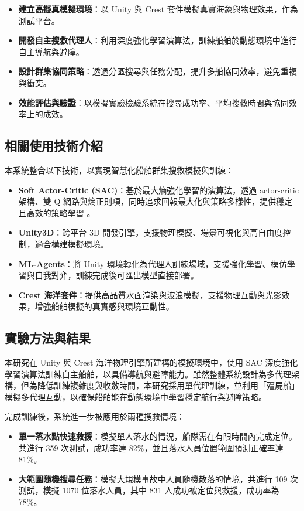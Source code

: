\documentclass[12pt,a4paper]{article}
\begin{document}
\begin{itemize}
\item \textbf{建立高擬真模擬環境}：以 Unity 與 Crest 套件模擬真實海象與物理效果，作為測試平台。
\item \textbf{開發自主搜救代理人}：利用深度強化學習演算法，訓練船舶於動態環境中進行自主導航與避障。
\item \textbf{設計群集協同策略}：透過分區搜尋與任務分配，提升多船協同效率，避免重複與衝突。
\item \textbf{效能評估與驗證}：以模擬實驗檢驗系統在搜尋成功率、平均搜救時間與協同效率上的成效。
\end{itemize}

\subsection{相關使用技術介紹}

本系統整合以下技術，以實現智慧化船舶群集搜救模擬與訓練：

\begin{itemize}
	\item \textbf{Soft Actor-Critic (SAC)}：基於最大熵強化學習的演算法，透過 actor-critic 架構、雙 Q 網路與熵正則項，同時追求回報最大化與策略多樣性，提供穩定且高效的策略學習 \cite{Atari}\cite{SAC}。
	\item \textbf{Unity3D}：跨平台 3D 開發引擎，支援物理模擬、場景可視化與高自由度控制，適合構建模擬環境。
	\item \textbf{ML-Agents}：將 Unity 環境轉化為代理人訓練場域，支援強化學習、模仿學習與自我對弈，訓練完成後可匯出模型直接部署\cite{MLAgentRepo}。
	 \item \textbf{Crest 海洋套件}：提供高品質水面渲染與波浪模擬，支援物理互動與光影效果，增強船舶模擬的真實感與環境互動性\cite{CrestIntro}。
\end{itemize}

\subsection{實驗方法與結果}
本研究在 Unity 與 Crest 海洋物理引擎所建構的模擬環境中，使用 SAC 深度強化學習演算法訓練自主船舶，以具備導航與避障能力。雖然整體系統設計為多代理架構，但為降低訓練複雜度與收斂時間，本研究採用單代理訓練，並利用「殭屍船」模擬多代理互動，以確保船舶能在動態環境中學習穩定航行與避障策略。

完成訓練後，系統進一步被應用於兩種搜救情境：  
\begin{itemize}
    \item \textbf{單一落水點快速救援}：模擬單人落水的情況，船隊需在有限時間內完成定位。共進行 359 次測試，成功率達 82\%，並且落水人員位置範圍預測正確率達 81\%。  
    \item \textbf{大範圍隨機搜尋任務}：模擬大規模事故中人員隨機散落的情境，共進行 109 次測試，模擬 1070 位落水人員，其中 831 人成功被定位與救援，成功率為 78\%。  
\end{itemize}
\end{document}
